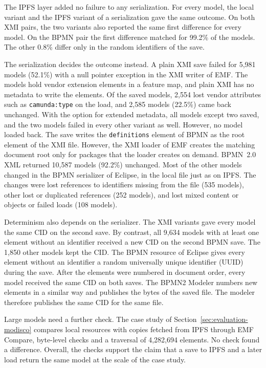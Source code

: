 \documentclass[5p,times,twocolumn]{elsarticle}
\theoremstyle{definition}
\theoremstyle{plain}
\begin{document}
The IPFS layer added no failure to any serialization. For every model, the local variant and the IPFS variant of a serialization gave the same outcome. On both XMI pairs, the two variants also reported the same first difference for every model. On the BPMN pair the first difference matched for 99.2\% of the models. The other 0.8\% differ only in the random identifiers of the save.

The serialization decides the outcome instead. A plain XMI save failed for 5,981 models (52.1\%) with a null pointer exception in the XMI writer of EMF. The models hold vendor extension elements in a feature map, and plain XMI has no metadata to write the elements. Of the saved models, 2,554 lost vendor attributes such as \texttt{camunda:type} on the load, and 2,585 models (22.5\%) came back unchanged. With the option for extended metadata, all models except two saved, and the two models failed in every other variant as well. However, no model loaded back. The save writes the \texttt{definitions} element of BPMN as the root element of the XMI file. However, the XMI loader of EMF creates the matching document root only for packages that the loader creates on demand. BPMN~2.0 XML returned 10,587 models (92.2\%) unchanged. Most of the other models changed in the BPMN serializer of Eclipse, in the local file just as on IPFS. The changes were lost references to identifiers missing from the file (535 models), other lost or duplicated references (252 models), and lost mixed content or objects or failed loads (108 models).

Determinism also depends on the serializer. The XMI variants gave every model the same CID on the second save. By contrast, all 9,634 models with at least one element without an identifier received a new CID on the second BPMN save. The 1,850 other models kept the CID. The BPMN resource of Eclipse gives every element without an identifier a random universally unique identifier (UUID) during the save. After the elements were numbered in document order, every model received the same CID on both saves. The BPMN2 Modeler numbers new elements in a similar way and publishes the bytes of the saved file. The modeler therefore publishes the same CID for the same file.

Large models need a further check. The case study of Section~\ref{sec:evaluation-modisco} compares local resources with copies fetched from IPFS through EMF Compare, byte-level checks and a traversal of 4,282,694 elements. No check found a difference. Overall, the checks support the claim that a save to IPFS and a later load return the same model at the scale of the case study.
\end{document}
